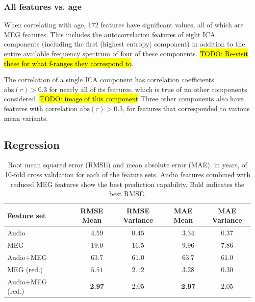 \documentclass[utf8]{frontiersSCNS} %
\begin{document}
\subsubsection{All features vs. age}

When correlating with age, 172 features have significant values, all of which are MEG features. This includes the autocorrelation features of eight ICA components (including the first (highest entropy) component) in addition to the entire available frequency spectrum of four of these components. \hl{TODO: Re-visit these for what f-ranges they correspond to}.

The correlation of a single ICA component has correlation coefficients $\text{abs}(r)>0.3$ for nearly all of its features, which is true of no other components considered. \hl{TODO: image of this component} Three other components also have features with correlation $\text{abs}(r)>0.3$, for features that corresponded to various mean variants.

\subsection{Regression}

\begin{table}[t]
  \centering
  \label{tab:reg_results}
  \begin{tabular}{| l | c | c | c | c |}
    \toprule
    \textbf{Feature set} & \textbf{RMSE Mean} & \textbf{RMSE Variance} & \textbf{MAE Mean} & \textbf{MAE Variance}       \\
    \toprule
        Audio~~~                             & ~~~$4.59$         &     $0.45$     & ~~~$3.34$         &     $0.37$       \\
        MEG~~~                               & ~~~$19.0$         &     $16.5$     & ~~~$9.96$         &     $7.86$       \\
        Audio+MEG~~~                         & ~~~$63.7$         &     $61.0$     & ~~~$63.7$         &     $61.0$       \\

        \midrule
       
        MEG (red.)~~~                        & ~~~$5.51$         &     $2.12$    & ~~~$3.28$          &     $0.30$       \\
        Audio+MEG (red.)~~~                  & ~~~\textbf{2.97}  &     $2.05$    & ~~~\textbf{2.97}         &     $2.05$      \\

    \hline
  \end{tabular}
  \caption{Root mean squared error (RMSE) and mean absolute error (MAE), in years, of 10-fold cross validation for each of the feature sets. Audio features combined with reduced MEG features show the best prediction capability. Bold indicates the best RMSE.}
\end{table}
\end{document}
